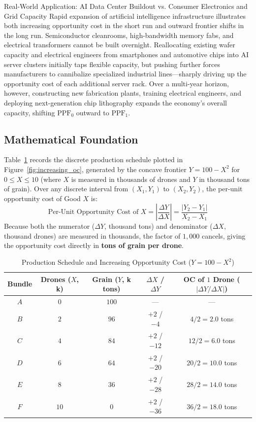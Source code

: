 \documentclass[11pt,letterpaper]{article}
\begin{document}
\begin{examplecase}{Real-World Application: AI Data Center Buildout vs. Consumer Electronics and Grid Capacity}
Rapid expansion of artificial intelligence infrastructure illustrates both increasing opportunity cost in the short run and outward frontier shifts in the long run. Semiconductor cleanrooms, high-bandwidth memory fabs, and electrical transformers cannot be built overnight. Reallocating existing wafer capacity and electrical engineers from smartphones and automotive chips into AI server clusters initially taps flexible capacity, but pushing further forces manufacturers to cannibalize specialized industrial lines—sharply driving up the opportunity cost of each additional server rack. Over a multi-year horizon, however, constructing new fabrication plants, training electrical engineers, and deploying next-generation chip lithography expands the economy's overall capacity, shifting $\text{PPF}_0$ outward to $\text{PPF}_1$.
\end{examplecase}

\subsection*{Mathematical Foundation}
Table~\ref{tab:increasing_oc} records the discrete production schedule plotted in Figure~\ref{fig:increasing_oc}, generated by the concave frontier $Y = 100 - X^2$ for $0 \le X \le 10$ (where $X$ is measured in thousands of drones and $Y$ in thousand tons of grain). Over any discrete interval from $(X_1, Y_1)$ to $(X_2, Y_2)$, the per-unit opportunity cost of Good $X$ is:
\begin{equation}
\text{Per-Unit Opportunity Cost of } X = \left|\frac{\Delta Y}{\Delta X}\right| = \frac{|Y_2 - Y_1|}{X_2 - X_1}
\end{equation}
Because both the numerator ($\Delta Y$, thousand tons) and denominator ($\Delta X$, thousand drones) are measured in thousands, the factor of $1{,}000$ cancels, giving the opportunity cost directly in \textbf{tons of grain per drone}.

\begin{table}[htbp]
\centering
\caption{Production Schedule and Increasing Opportunity Cost ($Y = 100 - X^2$)}
\label{tab:increasing_oc}
\begin{tabular}{@{}ccccc@{}}
\toprule
\textbf{Bundle} & \textbf{Drones ($X$, k)} & \textbf{Grain ($Y$, k tons)} & \textbf{$\Delta X$ / $\Delta Y$} & \textbf{OC of $1$ Drone ($\left|\Delta Y / \Delta X\right|$)} \\
\midrule
$A$ & $0$ & $100$ & --- & --- \\
$B$ & $2$ & $96$ & $+2$ / $-4$ & $4 / 2 = 2.0$ tons \\
$C$ & $4$ & $84$ & $+2$ / $-12$ & $12 / 2 = 6.0$ tons \\
$D$ & $6$ & $64$ & $+2$ / $-20$ & $20 / 2 = 10.0$ tons \\
$E$ & $8$ & $36$ & $+2$ / $-28$ & $28 / 2 = 14.0$ tons \\
$F$ & $10$ & $0$ & $+2$ / $-36$ & $36 / 2 = 18.0$ tons \\
\bottomrule
\end{tabular}
\end{table}
\end{document}
